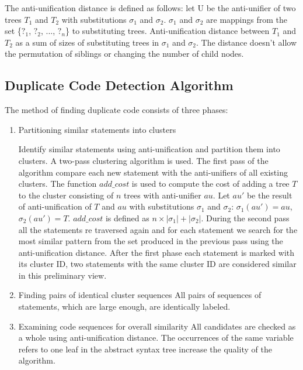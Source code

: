 \documentclass{acm_proc_article-sp}
\begin{document}
The anti-unification distance is defined as follows: let U be the anti-unifier of two trees $T_{1}$ and $T_{2}$ with substitutions $\sigma_{1}$ and $\sigma_{2}$. $\sigma_{1}$ and $\sigma_{2}$ are mappings from the set \{$?_{1}$, $?_{2}$, ..., $?_{n}$\} to substituting trees. Anti-unification distance between $T_{1}$ and $T_{2}$ as a sum of sizes of substituting trees in $\sigma_{1}$ and $\sigma_{2}$. The distance doesn't allow the permutation of siblings or changing the number of child nodes.


\subsection{Duplicate Code Detection Algorithm}
The method of finding duplicate code consists of three phases:
\begin{enumerate}[step 1]

    \item Partitioning similar statements into clusters
    
    Identify similar statements using anti-unification and partition them into clusters. A two-pass clustering algorithm is used. The first pass of the algorithm compare each new statement with the anti-unifiers of all existing clusters. The function $add\_cost$ is used to compute the cost of adding a tree $T$ to the cluster consisting of $n$ trees with anti-unifier $au$. Let $au'$ be the result of anti-unification of $T$ and $au$ with substitutions $\sigma_{1}$ and $\sigma_{2}$: $\sigma_{1}(au') = au$, $\sigma_{2}(au') = T$. $add\_cost$ is defined as $n \times |\sigma_{1}| + |\sigma_{2}|$. During the second pass all the statements re traversed again and for each statement we search for the most similar pattern from the set produced in the previous pass using the anti-unification distance. After the first phase each statement is marked with its cluster ID, two statements with the same cluster ID are considered similar in this preliminary view.

    \item Finding pairs of identical cluster sequences
    All pairs of sequences of statements, which are large enough, are identically labeled.
    
    \item Examining code sequences for overall similarity
    All candidates are checked as a whole using anti-unification distance. The occurrences of the same variable refers to one leaf in the abstract syntax tree increase the quality of the algorithm.
\end{enumerate}
\end{document}
